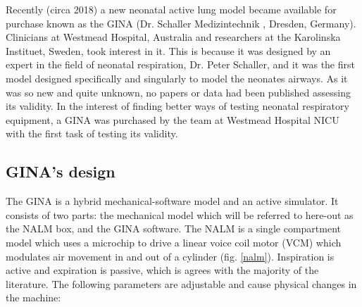 \documentclass[12pt, openany, oneside]{book}
\begin{document}
Recently (circa 2018) a new neonatal active lung model became available for purchase known as the GINA (Dr. Schaller Medizintechnik \texttrademark, Dresden, Germany). Clinicians at Westmead Hospital, Australia and researchers at the Karolinska Instituet, Sweden, took interest in it. This is because it was designed by an expert in the field of neonatal respiration, Dr. Peter Schaller, and it was the first model designed specifically and singularly to model the neonates airways. As it was so new and quite unknown, no papers or data had been published assessing its validity. In the interest of finding better ways of testing neonatal respiratory equipment, a GINA was purchased by the team at Westmead Hospital NICU with the first task of testing its validity.

\subsection{GINA's design}
The GINA is a hybrid mechanical-software model and an active simulator. It consists of two parts: the mechanical model which will be referred to here-out as the NALM box, and the GINA software. The NALM is a single compartment model which uses a microchip to drive a linear voice coil motor (VCM) which modulates air movement in and out of a cylinder (fig. \ref{nalm}). Inspiration is active and expiration is passive, which is agrees with the majority of the literature. The following parameters are adjustable and cause physical changes in the machine:
\end{document}
